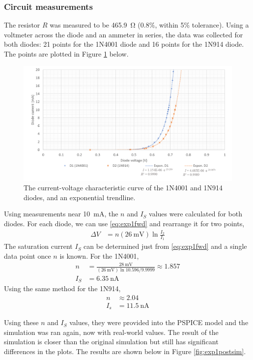\documentclass{report}
\begin{document}
\subsubsection{Circuit measurements}
The resistor $R$ was measured to be \SI{465.9}{\ohm} ($0.8\%$, within 5\% tolerance). Using a voltmeter across the diode and an ammeter in series, the data was collected for both diodes: 21 points for the 1N4001 diode and 16 points for the 1N914 diode. The points are plotted in Figure \ref{fig:exp1excel} below.
\begin{figure}[H]
	\centering
	\includegraphics[width=1.0\linewidth]{exp1excel}
	\caption{The current-voltage characteristic curve of the 1N4001 and 1N914 diodes, and an exponential trendline.}
	\label{fig:exp1excel}
\end{figure}

Using measurements near \SI{10}{\mA}, the $n$ and $I_S$ values were calculated for both diodes. For each diode, we can use \eqref{eq:exp1fwd} and rearrange it for two points, \begin{align*}
	\Delta V & = n \left( \SI{26}{\mV} \right) \ln \frac{I_2}{I_1}
\end{align*}
The saturation current $I_S$ can be determined just from \eqref{eq:exp1fwd} and a single data point once $n$ is known. For the 1N4001, \begin{align*}
	n & = \frac{\SI{28}{\mV}}{\left(\SI{26}{\mV}\right) \ln 10.596/9.9999} \approx 1.857 \\
	I_S & = \SI{6.35}{\nA}
\end{align*}
Using the same method for the 1N914, \begin{align*}
	n & \approx 2.04 \\
	I_s & = \SI{11.5}{\nA}
\end{align*}

Using these $n$ and $I_S$ values, they were provided into the PSPICE model and the simulation was ran again, now with real-world values. The result of the simulation is closer than the original simulation but still has significant differences in the plots. The results are shown below in Figure \ref{fig:exp1postsim}.
\end{document}
